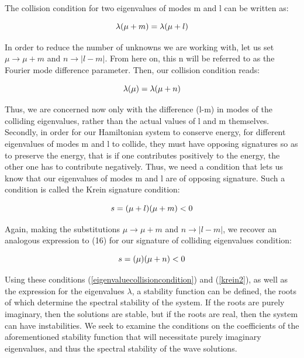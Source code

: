 \documentclass{article}
\begin{document}
\\

The collision condition for two eigenvalues of modes m and l can be written as:


 \begin{equation} \label{eq1}
  \lambda(\mu + m) = \lambda(\mu + l)
\\
\end{equation}

In order to reduce the number of unknowns we are working with, let us set \(\mu \rightarrow \mu + m \) and \(n \rightarrow |l-m|\). From here on, this n will be referred to as the Fourier mode difference parameter. Then, our collision condition reads: 

 \begin{equation} \label{eigenvaluecollisioncondition}
  \lambda(\mu) = \lambda(\mu + n)
\\
\end{equation}

Thus, we are concerned now only with the difference (l-m) in modes of the colliding eigenvalues, rather than the actual values of l and m themselves. Secondly, in order for our Hamiltonian system to conserve energy, for different eigenvalues of modes m and l to collide, they must have opposing signatures so as to preserve the energy, that is if one contributes positively to the energy, the other one has to contribute negatively. Thus, we need a condition that lets us know that our eigenvalues of modes m and l are of opposing signature. Such a condition is called the Krein signature condition:

 \begin{equation} \label{krein1}
  s = (\mu + l)(\mu + m) < 0
\\
\end{equation}

Again, making the substitutions \(\mu \rightarrow \mu + m \) and \(n \rightarrow |l-m|\), we recover an analogous expression to (16) for our signature of colliding eigenvalues condition:

 \begin{equation} \label{krein2}
  s = (\mu)(\mu + n) < 0
\\
\end{equation}


Using these conditions (\ref{eigenvaluecollisioncondition}) and (\ref{krein2}), as well as the expression for the eigenvalues \(\lambda\), a stability function can be defined, the roots of which determine the spectral stability of the system. If the roots are purely imaginary, then the solutions are stable, but if the roots are real, then the system can have instabilities.  We seek to examine the conditions on the coefficients of the aforementioned stability function that will necessitate purely imaginary eigenvalues, and thus the spectral stability of the wave solutions. \\
\end{document}
